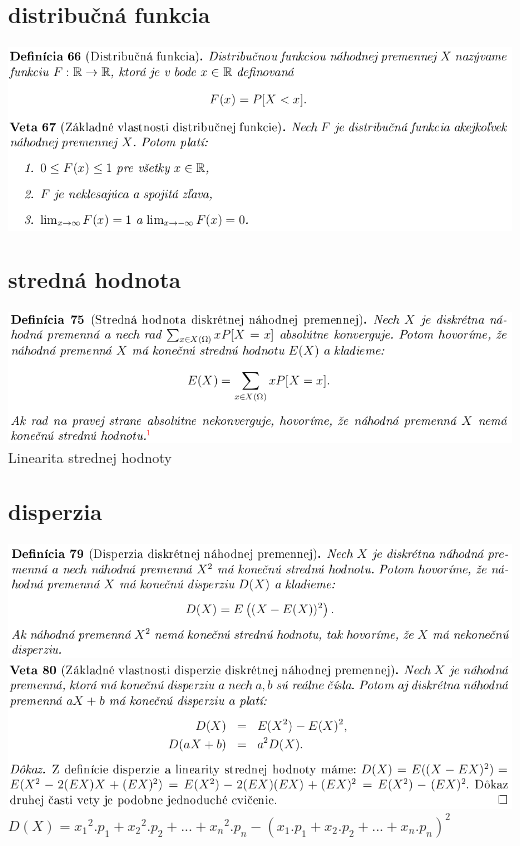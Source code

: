 \subsection {distribučná funkcia}
\includegraphics[width=1\textwidth]{images/dist_funk}\\
\subsection {stredná hodnota}
\includegraphics[width=1\textwidth]{images/stred_hod}\\
Linearita strednej hodnoty\\
\subsection {disperzia}
\includegraphics[width=1\textwidth]{images/disp}\\
\includegraphics[width=1\textwidth]{images/disp_II}\\
$D(X) = {x_1}^2.p_1 + {x_2}^2.p_2 + ... + {x_n}^2.p_n - (x_1.p_1 + x_2.p_2 + ... + x_n.p_n)^2$\\
